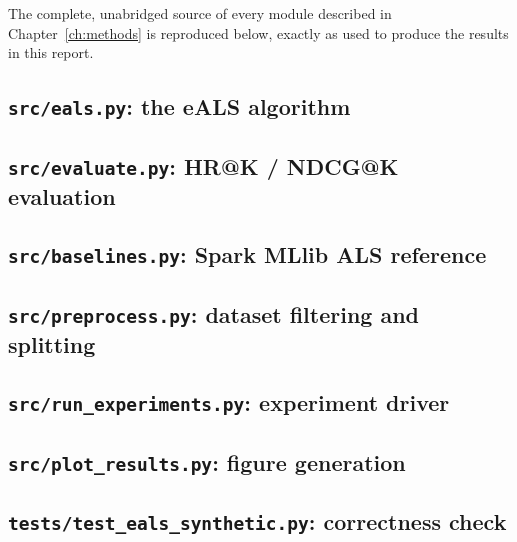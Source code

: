 The complete, unabridged source of every module described in
Chapter~\ref{ch:methods} is reproduced below, exactly as used to produce
the results in this report.

\subsection{\texttt{src/eals.py}: the eALS algorithm}


\subsection{\texttt{src/evaluate.py}: HR@K / NDCG@K evaluation}


\subsection{\texttt{src/baselines.py}: Spark MLlib ALS reference}


\subsection{\texttt{src/preprocess.py}: dataset filtering and splitting}


\subsection{\texttt{src/run\_experiments.py}: experiment driver}


\subsection{\texttt{src/plot\_results.py}: figure generation}


\subsection{\texttt{tests/test\_eals\_synthetic.py}: correctness check}

